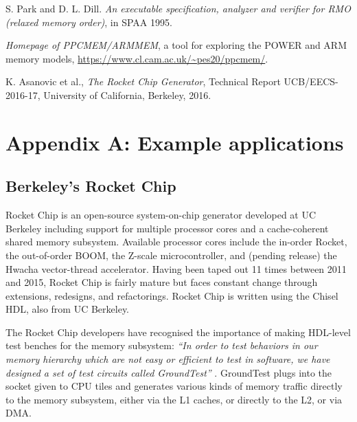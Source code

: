 \documentclass[11pt]{article}
\begin{document}
\begin{thebibliography}{99}
 S. Park and D. L. Dill.  \emph{ An executable
specification, analyzer and verifier for RMO (relaxed memory order)},
in SPAA 1995.

 \emph{Homepage of PPCMEM/ARMMEM},
a tool for exploring the POWER and ARM memory models,
\url{https://www.cl.cam.ac.uk/~pes20/ppcmem/}.

 K. Asanovic et al., \emph{The Rocket Chip
Generator}, Technical Report UCB/EECS-2016-17, University of
California, Berkeley, 2016.





\end{thebibliography}

\section*{Appendix A: Example applications}

\subsection*{Berkeley's Rocket Chip}

Rocket Chip is an open-source system-on-chip generator developed at UC
Berkeley including support for multiple processor cores and a
cache-coherent shared memory subsystem.  Available processor cores
include the in-order Rocket, the out-of-order BOOM, the Z-scale
microcontroller, and (pending release) the Hwacha vector-thread
accelerator.  Having been taped out 11 times between 2011 and 2015,
Rocket Chip is fairly mature but faces constant change through
extensions, redesigns, and refactorings.  Rocket Chip is written using
the Chisel HDL, also from UC Berkeley.

The Rocket Chip developers have recognised the importance of
making HDL-level test benches for the memory subsystem: \emph{``In
order to test behaviors in our memory hierarchy which are not easy or
efficient to test in software, we have designed a set of test circuits
called GroundTest''} \cite{RocketChip}.  GroundTest plugs into the
socket given to CPU tiles and generates various kinds of memory
traffic directly to the memory subsystem, either via the L1 caches, or
directly to the L2, or via DMA.
\end{document}

